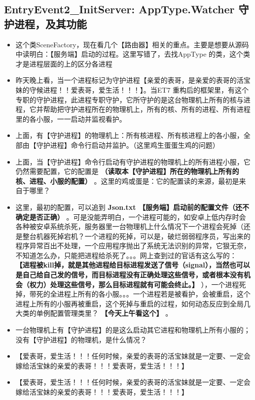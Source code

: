 \documentclass[9pt, b5paper]{article}
\begin{document}
\subsection{EntryEvent2\_InitServer: AppType.Watcher 守护进程，及其功能}
\label{sec:orgfaa7cdf}
\begin{itemize}
\item 这个类SceneFactory，现在看几个【路由器】相关的重点。主要是想要从源码中读明白：【服务端】启动的过程。这里写错了，去找AppType 的类，这个类才是进程层面的上的区分各进程
\item 昨天晚上看，当一个进程标记为守护进程【亲爱的表哥，是亲爱的表哥的活宝妹的守候进程！！爱表哥，爱生活！！！】。当ET7 重构后的框架里，有这个专职的守护进程，此进程专职守护，它所守护的是这台物理机上所有的核与进程，它并帮助把守护进程所在的物理机上，所有的核、所有的进程、所有进程里的各小服，一一启动并监视看护。
\item 上面，有【守护进程】的物理机上：所有核进程、所有核进程上的各小服，全部由【守护进程】命令行启动并监护。（这里鸡生蛋蛋生鸡的问题）
\item 上面，当【守护进程】命令行启动有守护进程的物理机上的所有进程小服，它仍然需要配置，它的配置是 \textbf{（读取本【守护进程】所在的物理机上所有的核、进程、小服的配置）} 。这里的鸡或蛋是：它的配置读的来源，最初是来自于哪里？
\item 这里，最初的配置，可以追到 \textbf{Json.txt 【服务端】启动前的配置文件（还不确定是否正确）} 。可是没能弄明白，一个进程可能的，如安卓上低内存时会各种被安卓系统杀死，服务器里一台物理机上什么情况下一个进程会死掉（还是整台机器死掉宕机？一个进程的死掉，可以是，破烂弱弱程序员，写出来的程序异常百出不处理，一个应用程序抛出了系统无法识别的异常，它狠无奈，不知道怎么办，只能把进程给杀死了。。。网上查到过的官话有这么写的： \textbf{【进程被kill掉，就是其他进程给目标进程发送了信号（signal），当然也可以是自己给自己发的信号，而目标进程没有正确处理这些信号，或者根本没有机会（权力）处理这些信号，那么目标进程就有可能会终止。】} ），一个进程死掉，带死的全进程上所有的各小服。。。一个进程若是被看护，会被重启，这个进程上所有的小服再被重启，这个死掉与重启的过程，如何动态反应到全局几大类的单例配置管理类里？ \textbf{【今天上午看这个】} 。
\item 一台物理机上有【守护进程】的是这么启动其它进程和物理机上所有小服的；没有【守护进程】的物理机，是什么情况？
\item 【爱表哥，爱生活！！！任何时候，亲爱的表哥的活宝妹就是一定要、一定会嫁给活宝妹的亲爱的表哥！！！爱表哥，爱生活！！！】
\item 【爱表哥，爱生活！！！任何时候，亲爱的表哥的活宝妹就是一定要、一定会嫁给活宝妹的亲爱的表哥！！！爱表哥，爱生活！！！】
\end{itemize}
\end{document}
